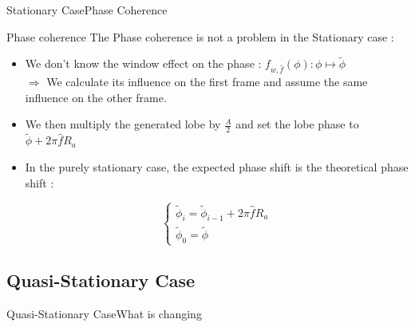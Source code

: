 \documentclass{bredelebeamer}
\begin{document}
\begin{frame}{Stationary Case}{Phase Coherence}

\begin{block}{Phase coherence}
The Phase coherence is not a problem in the Stationary case :
\begin{itemize}
\item We don't know the window effect on the phase : ${f_{w, \hat{f}}(\phi) : \phi \mapsto \tilde{\phi}}$  \\
$ \Rightarrow$ We calculate its influence on the first frame and assume the same influence on the other frame.

\item We then multiply the generated lobe by $\frac{A}{2}$ and set the lobe phase to $\tilde{\phi} + 2\pi \hat{f} R_a$   
\item In the purely stationary case, the expected phase shift is the theoretical phase shift :

\begin{equation}
\begin{cases}
\tilde{\phi}_i = \tilde{\phi}_{i-1} + 2\pi \hat{f} R_a \\
\tilde{\phi}_0 = \tilde{\phi}
\end{cases}
\end{equation}

\end{itemize}
\end{block}


\end{frame}
\subsection{Quasi-Stationary Case}
\begin{frame}{Quasi-Stationary Case}{What is changing}

\end{frame}
\end{document}
